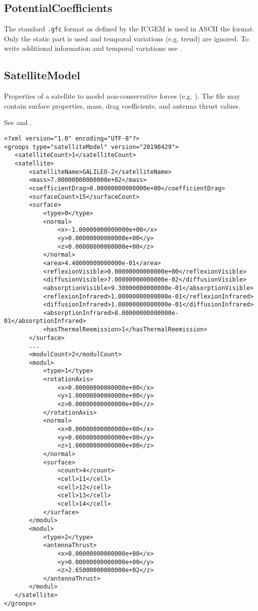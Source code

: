 \subsection{PotentialCoefficients}\label{general.fileFormat:potentialCoefficients}
The standard \verb|.gfc| format as defined by the ICGEM is used in ASCII the format.
Only the static part is used and temporal variations (e.g. trend) are ignored.
To write additional information and temporal variations use .


\subsection{SatelliteModel}\label{general.fileFormat:satelliteModel}
Properties of a satellite to model non-conservative forces (e.g. ).
The file may contain surface properties, mass, drag coefficients, and antenna thrust values.

See  and .

\begin{verbatim}
<?xml version="1.0" encoding="UTF-8"?>
<groops type="satelliteModel" version="20190429">
   <satelliteCount>1</satelliteCount>
   <satellite>
       <satelliteName>GALILEO-2</satelliteName>
       <mass>7.00000000000000e+02</mass>
       <coefficientDrag>0.00000000000000e+00</coefficientDrag>
       <surfaceCount>15</surfaceCount>
       <surface>
           <type>0</type>
           <normal>
               <x>-1.00000000000000e+00</x>
               <y>0.00000000000000e+00</y>
               <z>0.00000000000000e+00</z>
           </normal>
           <area>4.40000000000000e-01</area>
           <reflexionVisible>0.00000000000000e+00</reflexionVisible>
           <diffusionVisible>7.00000000000000e-02</diffusionVisible>
           <absorptionVisible>9.30000000000000e-01</absorptionVisible>
           <reflexionInfrared>1.00000000000000e-01</reflexionInfrared>
           <diffusionInfrared>1.00000000000000e-01</diffusionInfrared>
           <absorptionInfrared>8.00000000000000e-01</absorptionInfrared>
           <hasThermalReemission>1</hasThermalReemission>
       </surface>
       ...
       <modulCount>2</modulCount>
       <modul>
           <type>1</type>
           <rotationAxis>
               <x>0.00000000000000e+00</x>
               <y>1.00000000000000e+00</y>
               <z>0.00000000000000e+00</z>
           </rotationAxis>
           <normal>
               <x>0.00000000000000e+00</x>
               <y>0.00000000000000e+00</y>
               <z>1.00000000000000e+00</z>
           </normal>
           <surface>
               <count>4</count>
               <cell>11</cell>
               <cell>12</cell>
               <cell>13</cell>
               <cell>14</cell>
           </surface>
       </modul>
       <modul>
           <type>2</type>
           <antennaThrust>
               <x>0.00000000000000e+00</x>
               <y>0.00000000000000e+00</y>
               <z>2.65000000000000e+02</z>
           </antennaThrust>
       </modul>
   </satellite>
</groops>
\end{verbatim}


